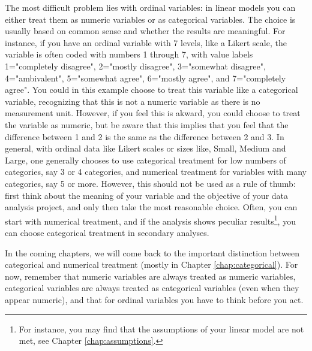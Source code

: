 \documentclass[]{book}\usepackage[]{graphicx}\usepackage[]{color}
\begin{document}
The most difficult problem lies with ordinal variables: in linear models you can either treat them as numeric variables or as categorical variables. The choice is usually based on common sense and whether the results are meaningful. For instance, if you have an ordinal variable with 7 levels, like a Likert scale, the variable is often coded with numbers 1 through 7, with value labels 1="completely disagree", 2="mostly disagree", 3="somewhat disagree", 4="ambivalent", 5="somewhat agree", 6="mostly agree", and 7="completely agree". You could in this example choose to treat this variable like a categorical variable, recognizing that this is not a numeric variable as there is no measurement unit. However, if you feel this is akward, you could choose to treat the variable as numeric, but be aware that this implies that you feel that the difference between 1 and 2 is the same as the difference between 2 and 3. In general, with ordinal data like Likert scales or sizes like, Small, Medium and Large, one generally chooses to use categorical treatment for low numbers of categories, say 3 or 4 categories, and numerical treatment for variables with many categories, say 5 or more. However, this should not be used as a rule of thumb: first think about the meaning of your variable and the objective of your data analysis project, and only then take the most reasonable choice. Often, you can start with numerical treatment, and if the analysis shows peculiar results\footnote{For instance, you may find that the assumptions of your linear model are not met, see Chapter \ref{chap:assumptions}.}, you can choose categorical treatment in secondary analyses.

In the coming chapters, we will come back to the important distinction between categorical and numerical treatment (mostly in Chapter \ref{chap:categorical}). For now, remember that numeric variables are always treated as numeric variables, categorical variables are always treated as categorical variables (even when they appear numeric), and that for ordinal variables you have to think before you act.
\end{document}
